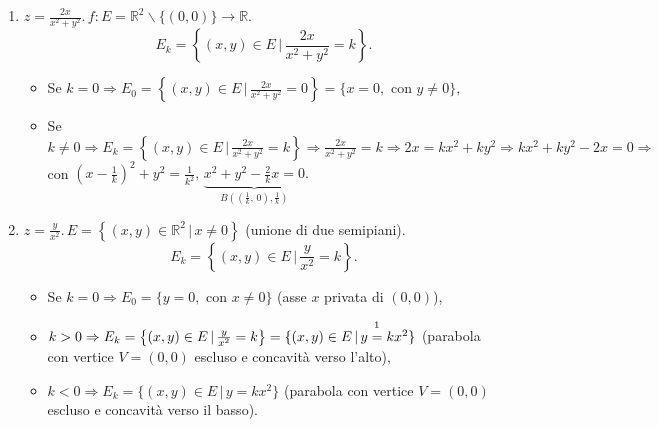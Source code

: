 \begin{example}
\begin{enumerate}
\begin{itemize}
\begin{figure}
                \caption{Grafico di $f(x,y)=x^2+9y^2$.}\label{fig:esempio_ellisse}
            \end{figure}
        \end{itemize}
        \item $z=\frac{2x}{x^2+y^2}.\, f:E=\mathbb R^2\backslash\{(0,0)\}\rightarrow\mathbb R.$
        \begin{equation*}
            E_k=\left\{(x,y)\in E\,|\, \frac{2x}{x^2+y^2}=k\right\}.
        \end{equation*}
        \begin{itemize}
            \item Se $k=0\Rightarrow E_0=\left\{(x,y)\in E\,|\, \frac{2x}{x^2+y^2}=0\right\}=\{x=0, \text{ con } y\neq 0\},$
            \item Se $k\neq 0\Rightarrow E_k=\left\{(x,y)\in E\,|\, \frac{2x}{x^2+y^2}=k\right\}\Rightarrow\frac{2x}{x^2+y^2}=k\Rightarrow 2x=kx^2+ky^2\Rightarrow kx^2+ky^2-2x=0\Rightarrow$ con $\left(x-\frac{1}{k}\right)^2+y^2=\frac{1}{k^2 },\, \underbrace{x^2+y^2-\frac{2}{k}x=0}_{B\left(\left(\frac{1}{k},\, 0\right),\frac{1}{k}\right)}.$
        \end{itemize}
        \item $z=\frac{y}{x^2}.\, E=\left\{(x,y)\in\mathbb R^2\,|\, x\neq 0\right\}$ (unione di due semipiani).
        \begin{equation*}
            E_k=\left\{(x,y)\in E\,|\, \frac{y}{x^2}=k\right\}.
        \end{equation*}
        \begin{itemize}
            \item Se $k=0\Rightarrow E_0=\{y=0,\text{ con } x\neq 0\}$ (asse $x$ privata di $(0,0)$),
            \item $k>0 \Rightarrow E_k=\left\{(x,y)\in E\,|\, \frac{y}{x^2}=k\right\}=\{(x,y)\in E\,|\, y\overset{\footnotemark}{=}kx^2\}$ (parabola con vertice $V=(0,0)$ escluso e concavità verso l'alto),
            \item $k<0\Rightarrow E_k=\{(x,y)\in E\,|\, y=kx^2\}$ (parabola con vertice $V=(0,0)$ escluso e concavità verso il basso).

\end{itemize}
\end{enumerate}
\end{example}
